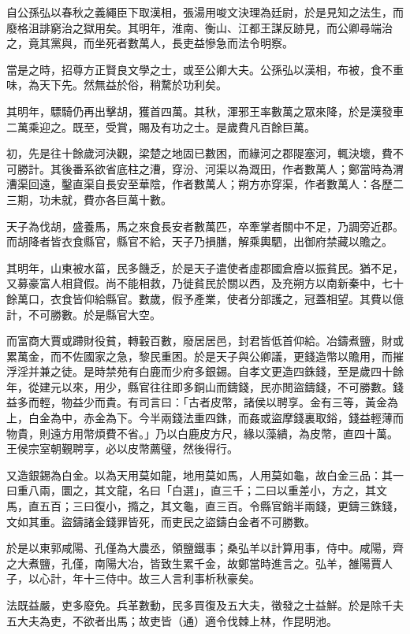 \begin{pinyinscope}
自公孫弘以春秋之義繩臣下取漢相，張湯用唆文決理為廷尉，於是見知之法生，而廢格沮誹窮治之獄用矣。其明年，淮南、衡山、江都王謀反跡見，而公卿尋端治之，竟其黨與，而坐死者數萬人，長吏益慘急而法令明察。

當是之時，招尊方正賢良文學之士，或至公卿大夫。公孫弘以漢相，布被，食不重味，為天下先。然無益於俗，稍騖於功利矣。

其明年，驃騎仍再出擊胡，獲首四萬。其秋，渾邪王率數萬之眾來降，於是漢發車二萬乘迎之。既至，受賞，賜及有功之士。是歲費凡百餘巨萬。

初，先是往十餘歲河決觀，梁楚之地固已數困，而緣河之郡隄塞河，輒決壞，費不可勝計。其後番系欲省底柱之漕，穿汾、河渠以為溉田，作者數萬人；鄭當時為渭漕渠回遠，鑿直渠自長安至華陰，作者數萬人；朔方亦穿渠，作者數萬人：各歷二三期，功未就，費亦各巨萬十數。

天子為伐胡，盛養馬，馬之來食長安者數萬匹，卒牽掌者關中不足，乃調旁近郡。而胡降者皆衣食縣官，縣官不給，天子乃損膳，解乘輿駟，出御府禁藏以贍之。

其明年，山東被水菑，民多饑乏，於是天子遣使者虛郡國倉廥以振貧民。猶不足，又募豪富人相貸假。尚不能相救，乃徙貧民於關以西，及充朔方以南新秦中，七十餘萬口，衣食皆仰給縣官。數歲，假予產業，使者分部護之，冠蓋相望。其費以億計，不可勝數。於是縣官大空。

而富商大賈或蹛財役貧，轉轂百數，廢居居邑，封君皆低首仰給。冶鑄煮鹽，財或累萬金，而不佐國家之急，黎民重困。於是天子與公卿議，更錢造幣以贍用，而摧浮淫并兼之徒。是時禁苑有白鹿而少府多銀錫。自孝文更造四銖錢，至是歲四十餘年，從建元以來，用少，縣官往往即多銅山而鑄錢，民亦閒盜鑄錢，不可勝數。錢益多而輕，物益少而貴。有司言曰：「古者皮幣，諸侯以聘享。金有三等，黃金為上，白金為中，赤金為下。今半兩錢法重四銖，而姦或盜摩錢裏取鋊，錢益輕薄而物貴，則遠方用幣煩費不省。」乃以白鹿皮方尺，緣以藻繢，為皮幣，直四十萬。王侯宗室朝覲聘享，必以皮幣薦璧，然後得行。

又造銀錫為白金。以為天用莫如龍，地用莫如馬，人用莫如龜，故白金三品：其一曰重八兩，圜之，其文龍，名曰「白選」，直三千；二曰以重差小，方之，其文馬，直五百；三曰復小，撱之，其文龜，直三百。令縣官銷半兩錢，更鑄三銖錢，文如其重。盜鑄諸金錢罪皆死，而吏民之盜鑄白金者不可勝數。

於是以東郭咸陽、孔僅為大農丞，領鹽鐵事；桑弘羊以計算用事，侍中。咸陽，齊之大煮鹽，孔僅，南陽大冶，皆致生累千金，故鄭當時進言之。弘羊，雒陽賈人子，以心計，年十三侍中。故三人言利事析秋豪矣。

法既益嚴，吏多廢免。兵革數動，民多買復及五大夫，徵發之士益鮮。於是除千夫五大夫為吏，不欲者出馬；故吏皆（通）適令伐棘上林，作昆明池。


\end{pinyinscope}
